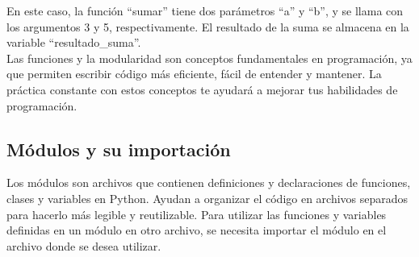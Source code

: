 En este caso, la función ``sumar'' tiene dos parámetros ``a'' y ``b'', y se llama con los argumentos 3 y 5, respectivamente. El resultado de la suma se almacena en la variable ``resultado\_suma''.\\

Las funciones y la modularidad son conceptos fundamentales en programación, ya que permiten escribir código más eficiente, fácil de entender y mantener. La práctica constante con estos conceptos te ayudará a mejorar tus habilidades de programación.

\subsection{Módulos y su importación}
Los módulos son archivos que contienen definiciones y declaraciones de funciones, clases y variables en Python. Ayudan a organizar el código en archivos separados para hacerlo más legible y reutilizable. Para utilizar las funciones y variables definidas en un módulo en otro archivo, se necesita importar el módulo en el archivo donde se desea utilizar.

